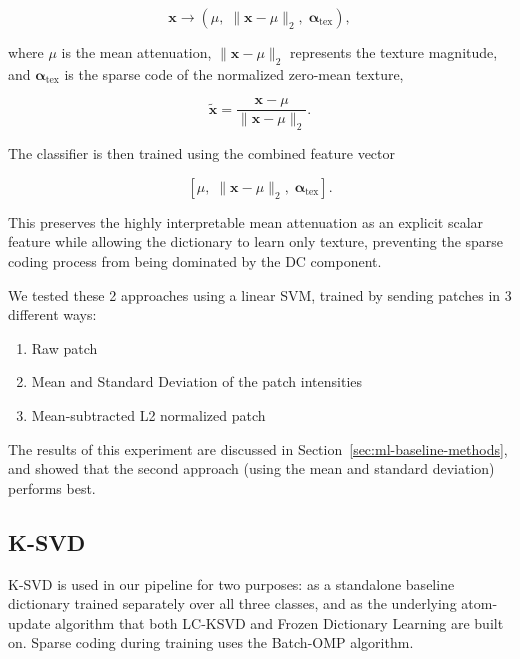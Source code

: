 \begin{equation}[Mean-Texture Patch Decomposition]
\mathbf{x} \rightarrow \left(\mu,\; \|\mathbf{x}-\mu\|_2,\; \boldsymbol{\alpha}_{\mathrm{tex}}\right),
\end{equation}

\noindent where $\mu$ is the mean attenuation, $\|\mathbf{x}-\mu\|_2$ represents the texture magnitude, and
$\boldsymbol{\alpha}_{\mathrm{tex}}$ is the sparse code of the normalized zero-mean texture,

\begin{equation}[Normalized Zero-Mean Texture]
\tilde{\mathbf{x}}=\frac{\mathbf{x}-\mu}{\|\mathbf{x}-\mu\|_2}.
\end{equation}

\noindent The classifier is then trained using the combined feature vector

\begin{equation}[Combined Feature Vector]
\left[\mu,\; \|\mathbf{x}-\mu\|_2,\; \boldsymbol{\alpha}_{\mathrm{tex}}\right].
\end{equation}

This preserves the highly interpretable mean attenuation as an explicit scalar feature while allowing the dictionary to learn only
texture, preventing the sparse coding process from being dominated by the DC component.

We tested these 2 approaches using a linear SVM, trained by sending patches in 3 different ways:
\begin{enumerate}
    \item Raw patch
    \item Mean and Standard Deviation of the patch intensities
    \item Mean-subtracted L2 normalized patch
\end{enumerate}

The results of this experiment are discussed in Section~\ref{sec:ml-baseline-methods}, and showed that the second approach
(using the mean and standard deviation) performs best.

\subsection{K-SVD}
\label{sec:ksvd}

K-SVD is used in our pipeline for two purposes: as a standalone baseline dictionary trained separately over all three classes,
and as the underlying atom-update algorithm that both LC-KSVD and Frozen Dictionary Learning are built on.
Sparse coding during training uses the Batch-OMP algorithm.

